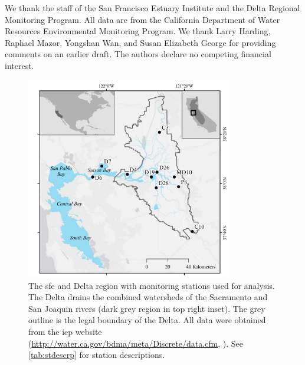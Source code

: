 \documentclass[letterpaper,12pt,oneside]{article}\usepackage[]{graphicx}\usepackage[]{color}
\begin{document}
We thank the staff of the San Francisco Estuary Institute and the Delta Regional Monitoring Program.  All data are from the California Department of Water Resources Environmental Monitoring Program. We thank Larry Harding, Raphael Mazor, Yongshan Wan, and Susan Elizabeth George for providing comments on an earlier draft. The authors declare no competing financial interest.

\begin{singlespace}


\end{singlespace}
\clearpage


\begin{figure}
\centering
\includegraphics[width=0.8\textwidth,page=1]{figs/delt_map.pdf}
\caption{The \acl{sfe} and Delta region with monitoring stations used for analysis. The Delta drains the combined watersheds of the Sacramento and San Joaquin rivers (dark grey region in top right inset). The grey outline is the legal boundary of the Delta. All data were obtained from the \acl{iep} website (\url{http://water.ca.gov/bdma/meta/Discrete/data.cfm}, \cite{IEP13}). See \cref{tab:stdescrp} for station descriptions.}
\label{fig:delt_map}   
\end{figure}
\end{document}
